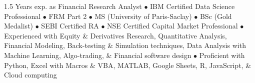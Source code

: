 \par{\vspace*{-15px}
1.5 Years exp. as Financial Research Analyst $\bullet$ IBM Certified Data Science Professional $\bullet$ FRM Part 2 $\bullet$ MS (University of Paris-Saclay) $\bullet$ BSc (Gold Medalist) $\bullet$ SEBI Certified RA $\bullet$ NSE Certified Capital Market Professional $\bullet$ Experienced with Equity \& Derivatives Research, Quantitative Analysis, Financial Modeling, Back-testing \& Simulation techniques, Data Analysis with Machine Learning, Algo-trading, \& Financial software design $\bullet$ Proficient with Python, Excel with Macros \& VBA, MATLAB, Google Sheets, R, JavaScript, \& Cloud computing}